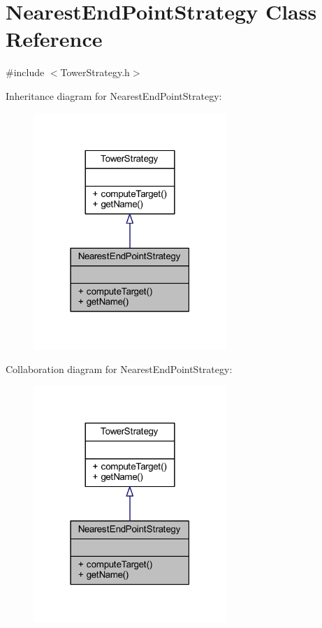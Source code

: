 \hypertarget{class_nearest_end_point_strategy}{\section{Nearest\+End\+Point\+Strategy Class Reference}
\label{class_nearest_end_point_strategy}
}


{\ttfamily \#include $<$Tower\+Strategy.\+h$>$}



Inheritance diagram for Nearest\+End\+Point\+Strategy\+:
\nopagebreak
\begin{figure}[H]
\begin{center}
\leavevmode
\includegraphics[width=207pt]{class_nearest_end_point_strategy__inherit__graph}
\end{center}
\end{figure}


Collaboration diagram for Nearest\+End\+Point\+Strategy\+:
\nopagebreak
\begin{figure}[H]
\begin{center}
\leavevmode
\includegraphics[width=207pt]{class_nearest_end_point_strategy__coll__graph}
\end{center}
\end{figure}
